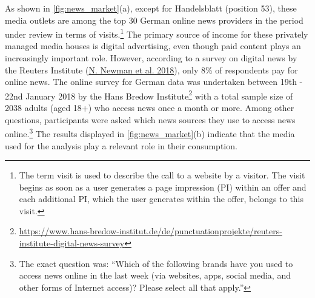 \documentclass[
  12pt,
]{article}
\begin{document}
As shown in \autoref{fig:news_market}(a), except for Handelsblatt
(position 53), these media outlets are among the top 30 German online
news providers in the period under review in terms of visits.\footnote{The
  term visit is used to describe the call to a website by a visitor. The
  visit begins as soon as a user generates a page impression (PI) within
  an offer and each additional PI, which the user generates within the
  offer, belongs to this visit.} The primary source of income for these
privately managed media houses is digital advertising, even though paid
content plays an increasingly important role. However, according to a
survey on digital news by the Reuters Institute
(\protect\hyperlink{ref-newman_reuters_2018}{N. Newman et al. 2018}),
only 8\% of respondents pay for online news. The online survey for
German data was undertaken between 19th - 22nd January 2018 by the Hans
Bredow Institute\footnote{\url{https://www.hans-bredow-institut.de/de/punctuationprojekte/reuters-institute-digital-news-survey}}
with a total sample size of 2038 adults (aged 18+) who access news once
a month or more. Among other questions, participants were asked which
news sources they use to access news online.\footnote{The exact question
  was: ``Which of the following brands have you used to access news
  online in the last week (via websites, apps, social media, and other
  forms of Internet access)? Please select all that apply.''} The
results displayed in \autoref{fig:news_market}(b) indicate that the
media used for the analysis play a relevant role in their consumption.
\end{document}

